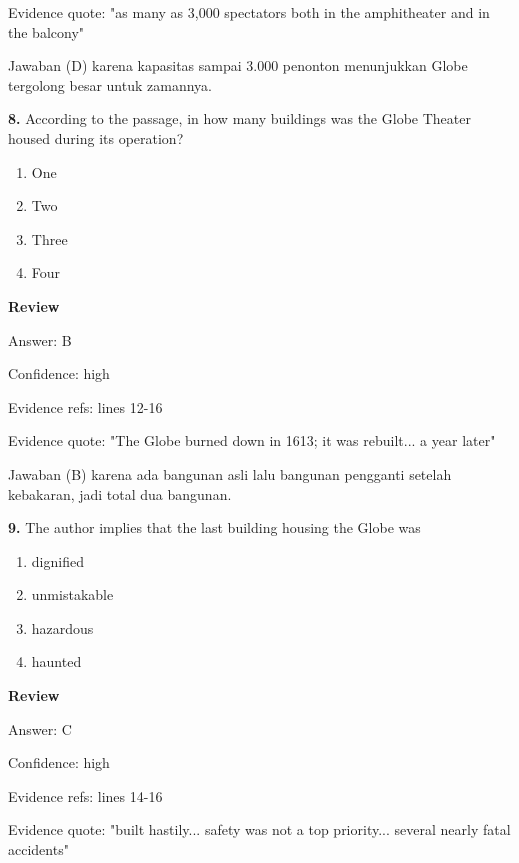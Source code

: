 \documentclass[12pt]{article}
\begin{document}
Evidence quote: "as many as 3,000 spectators both in the amphitheater and in the balcony"\par
Jawaban (D) karena kapasitas sampai 3.000 penonton menunjukkan Globe tergolong besar untuk zamannya.\par
\endgroup
\par
\vspace{0.25\baselineskip}
\noindent\textbf{8.} According to the passage, in how many buildings was the Globe Theater housed during its operation?
\begin{enumerate}[label=(\Alph*),leftmargin=*,itemsep=0.2em]
\item One
\item Two
\item Three
\item Four
\end{enumerate}
\par
\begingroup
\setlength{\parskip}{0pt}
\setlength{\parindent}{0pt}
\textbf{Review}\par
Answer: B\par
Confidence: high\par
Evidence refs: lines 12-16\par
Evidence quote: "The Globe burned down in 1613; it was rebuilt... a year later"\par
Jawaban (B) karena ada bangunan asli lalu bangunan pengganti setelah kebakaran, jadi total dua bangunan.\par
\endgroup
\par
\vspace{0.25\baselineskip}
\noindent\textbf{9.} The author implies that the last building housing the Globe was
\begin{enumerate}[label=(\Alph*),leftmargin=*,itemsep=0.2em]
\item dignified
\item unmistakable
\item hazardous
\item haunted
\end{enumerate}
\par
\begingroup
\setlength{\parskip}{0pt}
\setlength{\parindent}{0pt}
\textbf{Review}\par
Answer: C\par
Confidence: high\par
Evidence refs: lines 14-16\par
Evidence quote: "built hastily... safety was not a top priority... several nearly fatal accidents"\par
\end{document}
